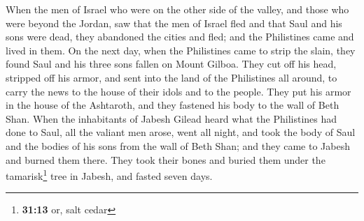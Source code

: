  When the men of Israel who were on the other side of the
valley, and those who were beyond the Jordan, saw that the men of Israel
fled and that Saul and his sons were dead, they abandoned the cities and
fled; and the Philistines came and lived in them.  On the
next day, when the Philistines came to strip the slain, they found Saul
and his three sons fallen on Mount Gilboa.  They cut off
his head, stripped off his armor, and sent into the land of the
Philistines all around, to carry the news to the house of their idols
and to the people.  They put his armor in the house of
the Ashtaroth, and they fastened his body to the wall of Beth Shan.
 When the inhabitants of Jabesh Gilead heard what the
Philistines had done to Saul,  all the valiant men arose,
went all night, and took the body of Saul and the bodies of his sons
from the wall of Beth Shan; and they came to Jabesh and burned them
there.  They took their bones and buried them under the
tamarisk\footnote{\textbf{31:13} or, salt cedar} tree in Jabesh, and
fasted seven days.
